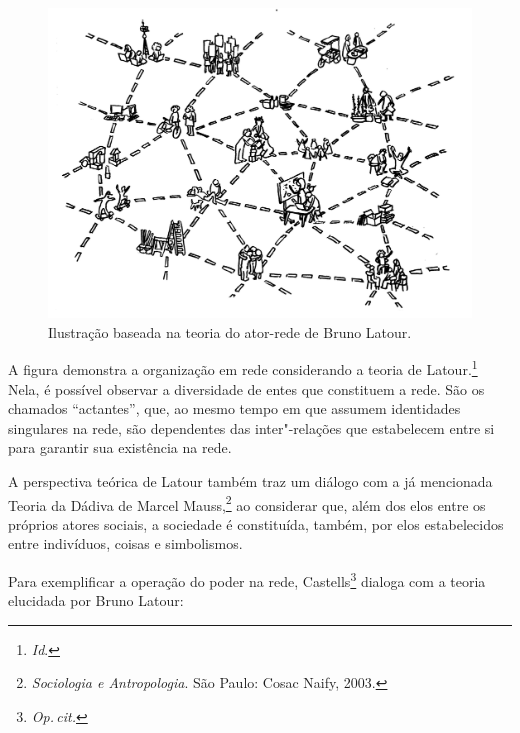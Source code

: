\begin{figure}[!ht]
\includegraphics[width=\textwidth]{./imgs/grafico4.jpg}
\caption{\formular\footnotesize{Ilustração baseada na teoria do ator-rede de Bruno Latour.\protect\footnotemark}}
\end{figure}


A figura demonstra a organização em rede considerando a teoria de
Latour.\footnote{\textit{Id}.} Nela, é possível observar a diversidade de entes que
constituem a rede. São os chamados ``actantes'', que, ao mesmo tempo em
que assumem identidades singulares na rede, são dependentes das
inter"-relações que estabelecem entre si para garantir sua existência na
rede.

A perspectiva teórica de Latour também traz um diálogo com a já
mencionada Teoria da Dádiva de Marcel Mauss,\footnote{\textit{Sociologia e Antropologia}. São Paulo: Cosac Naify, 2003.} ao considerar que,
além dos elos entre os próprios atores sociais, a sociedade é
constituída, também, por elos estabelecidos entre indivíduos, coisas e
simbolismos.

Para exemplificar a operação do poder na rede, Castells\footnote{\textit{Op.\,cit.}} dialoga
com a teoria elucidada por Bruno Latour:

